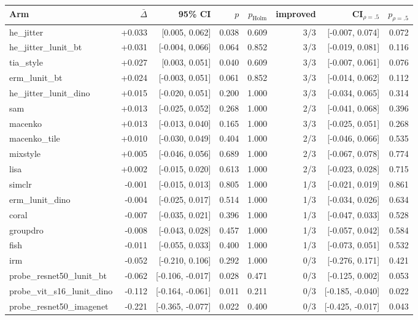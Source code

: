 \begin{tabular}{lrrrrrrr}
\toprule
Arm & $\bar\Delta$ & 95\% CI & $p$ & $p_\text{Holm}$ & improved & CI$_{\rho=.5}$ & $p_{\rho=.5}$ \\
\midrule
he\_jitter & +0.033 & [0.005, 0.062] & 0.038 & 0.609 & 3/3 & [-0.007, 0.074] & 0.072 \\
he\_jitter\_lunit\_bt & +0.031 & [-0.004, 0.066] & 0.064 & 0.852 & 3/3 & [-0.019, 0.081] & 0.116 \\
tia\_style & +0.027 & [0.003, 0.051] & 0.040 & 0.609 & 3/3 & [-0.007, 0.061] & 0.076 \\
erm\_lunit\_bt & +0.024 & [-0.003, 0.051] & 0.061 & 0.852 & 3/3 & [-0.014, 0.062] & 0.112 \\
he\_jitter\_lunit\_dino & +0.015 & [-0.020, 0.051] & 0.200 & 1.000 & 3/3 & [-0.034, 0.065] & 0.314 \\
sam & +0.013 & [-0.025, 0.052] & 0.268 & 1.000 & 2/3 & [-0.041, 0.068] & 0.396 \\
macenko & +0.013 & [-0.013, 0.040] & 0.165 & 1.000 & 3/3 & [-0.025, 0.051] & 0.268 \\
macenko\_tile & +0.010 & [-0.030, 0.049] & 0.404 & 1.000 & 2/3 & [-0.046, 0.066] & 0.535 \\
mixstyle & +0.005 & [-0.046, 0.056] & 0.689 & 1.000 & 2/3 & [-0.067, 0.078] & 0.774 \\
lisa & +0.002 & [-0.015, 0.020] & 0.613 & 1.000 & 2/3 & [-0.023, 0.028] & 0.715 \\
simclr & -0.001 & [-0.015, 0.013] & 0.805 & 1.000 & 1/3 & [-0.021, 0.019] & 0.861 \\
erm\_lunit\_dino & -0.004 & [-0.025, 0.017] & 0.514 & 1.000 & 1/3 & [-0.034, 0.026] & 0.634 \\
coral & -0.007 & [-0.035, 0.021] & 0.396 & 1.000 & 1/3 & [-0.047, 0.033] & 0.528 \\
groupdro & -0.008 & [-0.043, 0.028] & 0.457 & 1.000 & 1/3 & [-0.057, 0.042] & 0.584 \\
fish & -0.011 & [-0.055, 0.033] & 0.400 & 1.000 & 1/3 & [-0.073, 0.051] & 0.532 \\
irm & -0.052 & [-0.210, 0.106] & 0.292 & 1.000 & 0/3 & [-0.276, 0.171] & 0.421 \\
probe\_resnet50\_lunit\_bt & -0.062 & [-0.106, -0.017] & 0.028 & 0.471 & 0/3 & [-0.125, 0.002] & 0.053 \\
probe\_vit\_s16\_lunit\_dino & -0.112 & [-0.164, -0.061] & 0.011 & 0.211 & 0/3 & [-0.185, -0.040] & 0.022 \\
probe\_resnet50\_imagenet & -0.221 & [-0.365, -0.077] & 0.022 & 0.400 & 0/3 & [-0.425, -0.017] & 0.043 \\
\bottomrule
\end{tabular}
